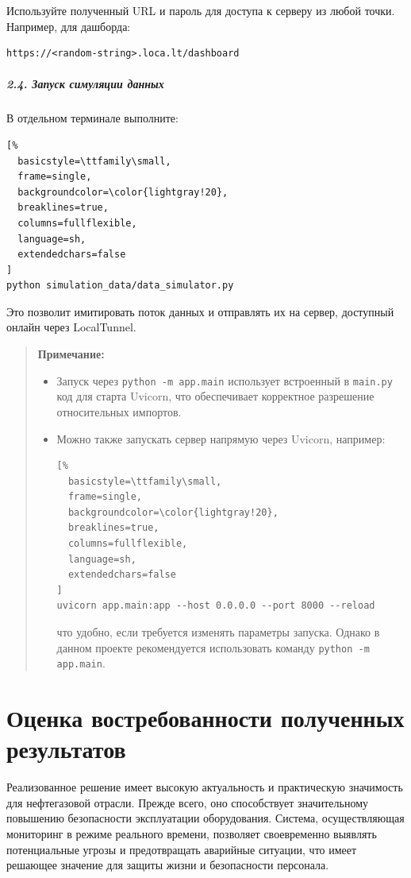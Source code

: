 \documentclass[a4paper,12pt]{article}
\begin{document}
\begin{flushleft}
Используйте полученный URL и пароль для доступа к серверу из любой точки. Например, для дашборда:
\begin{verbatim}
https://<random-string>.loca.lt/dashboard
\end{verbatim}

\subparagraph{2.4. Запуск симуляции данных}

В отдельном терминале выполните:
\begin{lstlisting}[%
  basicstyle=\ttfamily\small,
  frame=single,
  backgroundcolor=\color{lightgray!20},
  breaklines=true,
  columns=fullflexible,
  language=sh,
  extendedchars=false
]
python simulation_data/data_simulator.py
\end{lstlisting}

Это позволит имитировать поток данных и отправлять их на сервер, доступный онлайн через LocalTunnel.

\begin{quote}
\textbf{Примечание:}
\begin{itemize}
    \item Запуск через \texttt{python -m app.main} использует встроенный в \texttt{main.py} код для старта Uvicorn, что обеспечивает корректное разрешение относительных импортов.
    \item Можно также запускать сервер напрямую через Uvicorn, например:
\begin{lstlisting}[%
  basicstyle=\ttfamily\small,
  frame=single,
  backgroundcolor=\color{lightgray!20},
  breaklines=true,
  columns=fullflexible,
  language=sh,
  extendedchars=false
]
uvicorn app.main:app --host 0.0.0.0 --port 8000 --reload
\end{lstlisting}
    что удобно, если требуется изменять параметры запуска. Однако в данном проекте рекомендуется использовать команду \texttt{python -m app.main}.
\end{itemize}
\end{quote}

\section{Оценка востребованности полученных результатов}

Реализованное решение имеет высокую актуальность и практическую значимость для нефтегазовой отрасли. Прежде всего, оно способствует значительному повышению безопасности эксплуатации оборудования. Система, осуществляющая мониторинг в режиме реального времени, позволяет своевременно выявлять потенциальные угрозы и предотвращать аварийные ситуации, что имеет решающее значение для защиты жизни и безопасности персонала.


\end{flushleft}
\end{document}
